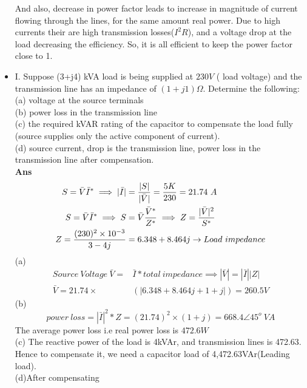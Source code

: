 \documentclass[12pt]{article}
\begin{document}
\begin{itemize}
      And also, decrease in power factor leads to increase in magnitude of current flowing through the lines, for the same amount real power. Due to high currents their are high transmission losses($I^2R$), and a voltage drop at the load decreasing the efficiency. So, it is all efficient to keep the power factor close to 1. 
      \item I. Suppose (3+j4)  kVA load is being supplied at $230 V$ ( load voltage) and the transmission line has an impedance of $(1 + j1)\Omega$. Determine the following: \\
      (a) voltage at the source terminals \\
      (b) power loss in the transmission line \\
      (c) the required kVAR rating of the capacitor to compensate the load fully (source supplies only the active component of current). \\
      (d) source current, drop is the transmission line, power loss in the transmission line after compensation.\vspace{0.2cm} \\
      \textbf{Ans}
      \begin{align}
          S = \bar{V} \bar{I}^* \implies |\bar{I}| &= \frac{|S|}{|\bar{V}|} = \frac{5K}{230} = 21.74 \ A \\
          S = \bar{V} \bar{I}^* \implies S &= \bar{V} \frac{\bar{V}^*}{Z^*} \implies Z = \frac{|\bar{V}|^2}{S^*} \vspace{0.3cm}\\
          Z = \frac{(230)^2 \times 10^{-3}}{3-4j} &= 6.348 + 8.464j \rightarrow Load \ impedance \\
      \end{align}
      (a)
      \begin{align}
       Source \ Voltage \ \bar{V} = &\bar{I}*total \ impedance \implies |\bar{V}| = |\bar{I}||Z| \\
       \bar{V} = 21.74 \times &(|6.348 + 8.464j + 1 + j|) = 260.5 V
      \end{align}
      (b)
      \begin{equation}
          power \ loss = |\bar{I}|^2 * Z = (21.74)^2 \times (1 + j) = 668.4\angle 45^o \ VA
      \end{equation}
      The average power loss i.e real power loss is $472.6 W$ \\
      (c) The reactive power of the load is 4kVAr, and transmission lines is 472.63. Hence to compensate it, we need a capacitor load of 4,472.63VAr(Leading load).\\
      (d)After compensating 
      

\end{itemize}
\end{document}
